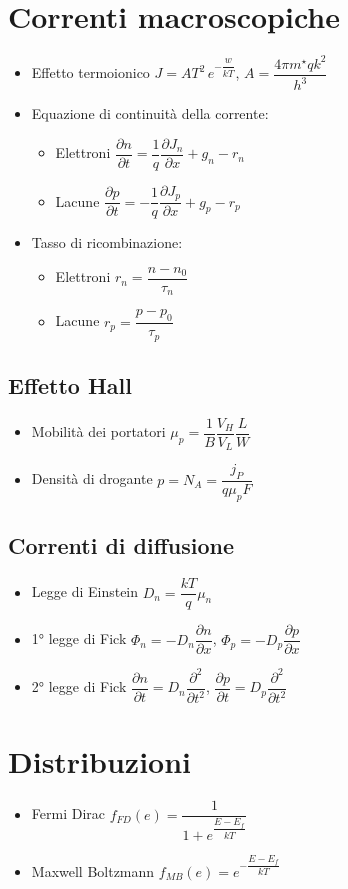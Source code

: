\documentclass{article}
\begin{document}
\section{Correnti macroscopiche}
\begin{itemize}
  \item Effetto termoionico \( \displaystyle J = A T ^ 2  \, e ^ {-\dfrac{w}{kT}} \), \( A = \dfrac{4 \pi m ^ \star q k ^2}{h ^ 3} \)
  \item Equazione di continuità della corrente:
        \begin{itemize}
          \item Elettroni  \( \dfrac{\partial n}{\partial t} = \dfrac{1}{q} \dfrac{\partial J_n}{\partial x} + g_n - r_n \)
          \item Lacune \( \dfrac{\partial p}{\partial t} =  -\dfrac{1}{q} \dfrac{\partial J_p}{\partial x} + g_p - r_p \)
        \end{itemize}
  \item Tasso di ricombinazione:
        \begin{itemize}
          \item Elettroni \( r_n = \dfrac{n - n_0}{\tau_n} \)
          \item Lacune \( r_p = \dfrac{p - p_0}{\tau_p} \)
        \end{itemize}
\end{itemize}


\subsection{Effetto Hall}
\begin{itemize}
  \item Mobilità dei portatori \( \mu_p = \dfrac{1}{B} \dfrac{V_H}{V_L} \dfrac{L}{W} \)
  \item Densità di drogante \( p = N_A = \dfrac{j_P}{q \mu_p F} \)
\end{itemize}


\subsection{Correnti di diffusione}
\begin{itemize}
  \item Legge di Einstein \( D_n = \dfrac{k T}{q} \mu_n \)
  \item 1° legge di Fick \( \Phi_n = - D_n \dfrac{\partial n}{\partial x} \), \( \Phi_p = - D_p \dfrac{\partial p}{\partial x} \)
  \item 2° legge di Fick \( \dfrac{\partial n}{\partial t} = D_n \dfrac{\partial ^ 2}{\partial t ^ 2}\), \( \dfrac{\partial p}{\partial t} = D_p \dfrac{\partial ^ 2}{\partial t ^ 2}\)
\end{itemize}

\section{Distribuzioni}
\begin{itemize}
  \item Fermi Dirac \( f_{FD} (e) = \dfrac{1}{1 + e ^{\dfrac{E - E_f}{kT}}} \)
  \item Maxwell Boltzmann \( f_{MB} (e) = e ^ {-\dfrac{E - E_f}{kT}} \)
\end{itemize}
\end{document}
